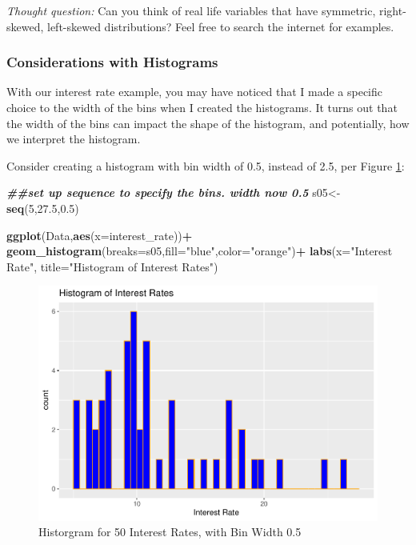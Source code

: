 \documentclass[
]{book}
\newenvironment{Shaded}{\begin{snugshade}}{\end{snugshade}}
\newcommand{\AttributeTok}[1]{\textcolor[rgb]{0.13,0.29,0.53}{#1}}
\newcommand{\DecValTok}[1]{\textcolor[rgb]{0.00,0.00,0.81}{#1}}
\newcommand{\DocumentationTok}[1]{\textcolor[rgb]{0.56,0.35,0.01}{\textbf{\textit{#1}}}}
\newcommand{\FloatTok}[1]{\textcolor[rgb]{0.00,0.00,0.81}{#1}}
\newcommand{\FunctionTok}[1]{\textcolor[rgb]{0.13,0.29,0.53}{\textbf{#1}}}
\newcommand{\NormalTok}[1]{#1}
\newcommand{\OtherTok}[1]{\textcolor[rgb]{0.56,0.35,0.01}{#1}}
\newcommand{\SpecialCharTok}[1]{\textcolor[rgb]{0.81,0.36,0.00}{\textbf{#1}}}
\newcommand{\StringTok}[1]{\textcolor[rgb]{0.31,0.60,0.02}{#1}}
\begin{document}
\emph{Thought question:} Can you think of real life variables that have symmetric, right-skewed, left-skewed distributions? Feel free to search the internet for examples.

\subsubsection{Considerations with Histograms}\label{considerations-with-histograms}

With our interest rate example, you may have noticed that I made a specific choice to the width of the bins when I created the histograms. It turns out that the width of the bins can impact the shape of the histogram, and potentially, how we interpret the histogram.

Consider creating a histogram with bin width of 0.5, instead of 2.5, per Figure \ref{fig:hist05}:

\begin{Shaded}
\begin{Highlighting}[]
\DocumentationTok{\#\#set up sequence to specify the bins. width now 0.5}
\NormalTok{s05}\OtherTok{\textless{}{-}}\FunctionTok{seq}\NormalTok{(}\DecValTok{5}\NormalTok{,}\FloatTok{27.5}\NormalTok{,}\FloatTok{0.5}\NormalTok{)}

\FunctionTok{ggplot}\NormalTok{(Data,}\FunctionTok{aes}\NormalTok{(}\AttributeTok{x=}\NormalTok{interest\_rate))}\SpecialCharTok{+}
  \FunctionTok{geom\_histogram}\NormalTok{(}\AttributeTok{breaks=}\NormalTok{s05,}\AttributeTok{fill=}\StringTok{"blue"}\NormalTok{,}\AttributeTok{color=}\StringTok{"orange"}\NormalTok{)}\SpecialCharTok{+}
  \FunctionTok{labs}\NormalTok{(}\AttributeTok{x=}\StringTok{"Interest Rate"}\NormalTok{, }\AttributeTok{title=}\StringTok{"Histogram of Interest Rates"}\NormalTok{)}
\end{Highlighting}
\end{Shaded}

\begin{figure}
\centering
\includegraphics{bookdown-demo_files/figure-latex/hist05-1.pdf}
\caption{\label{fig:hist05}Historgram for 50 Interest Rates, with Bin Width 0.5}
\end{figure}
\end{document}
